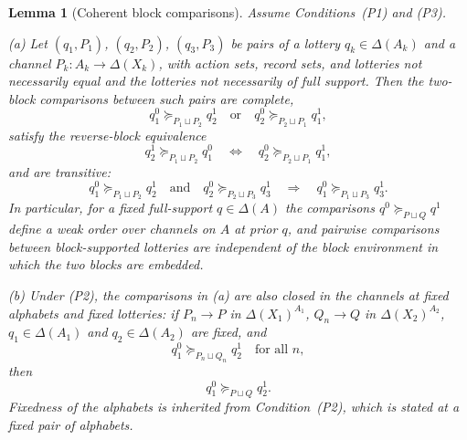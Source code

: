 \documentclass[11pt,a4paper]{article}
\newtheorem{lemma}[theorem]{Lemma}
\theoremstyle{definition}
\newcommand{\1}{\mathbf 1}
\begin{document}
\begin{lemma}[Coherent block comparisons]\label{pt:lem:blockcoh}
Assume Conditions~\textup{(P1)} and \textup{(P3)}.

\textup{(a)}  Let $(q_1,P_1)$, $(q_2,P_2)$, $(q_3,P_3)$ be pairs of a lottery $q_k\in\Delta(A_k)$ and a channel
$P_k:A_k\to\Delta(X_k)$, with action sets, record sets, and lotteries not necessarily equal and the lotteries not
necessarily of full support.  Then the two-block comparisons between such pairs are complete,
\[
q_1^0\succeq_{P_1\sqcup P_2}q_2^1
\quad\text{or}\quad
q_2^0\succeq_{P_2\sqcup P_1}q_1^1,
\]
satisfy the reverse-block equivalence
\[
q_2^1\succeq_{P_1\sqcup P_2}q_1^0
\quad\Longleftrightarrow\quad
q_2^0\succeq_{P_2\sqcup P_1}q_1^1,
\]
and are transitive:
\[
q_1^0\succeq_{P_1\sqcup P_2}q_2^1
\quad\text{and}\quad
q_2^0\succeq_{P_2\sqcup P_3}q_3^1
\quad\Longrightarrow\quad
q_1^0\succeq_{P_1\sqcup P_3}q_3^1.
\]
In particular, for a fixed full-support $q\in\Delta(A)$ the comparisons $q^0\succeq_{P\sqcup Q}q^1$ define a weak order
over channels on $A$ at prior $q$, and pairwise comparisons between block-supported lotteries are independent of the
block environment in which the two blocks are embedded.

\textup{(b)}  Under \textup{(P2)}, the comparisons in \textup{(a)} are also closed in the channels at fixed alphabets
and fixed lotteries: if $P_n\to P$ in $\Delta(X_1)^{A_1}$, $Q_n\to Q$ in $\Delta(X_2)^{A_2}$, $q_1\in\Delta(A_1)$ and
$q_2\in\Delta(A_2)$ are fixed, and
\[
q_1^0\succeq_{P_n\sqcup Q_n}q_2^1
\quad\text{for all }n,
\]
then
\[
q_1^0\succeq_{P\sqcup Q}q_2^1.
\]
Fixedness of the alphabets is inherited from Condition~\textup{(P2)}, which is stated at a fixed pair of alphabets.
\end{lemma}
\end{document}

